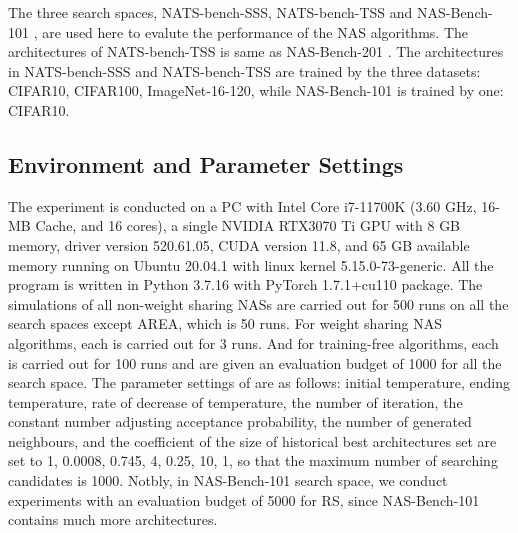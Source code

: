 \documentclass[sigconf]{acmart}
\begin{document}
    The three search spaces, NATS-bench-SSS, NATS-bench-TSS 
    \cite{Dong_2021} and NAS-Bench-101 \cite{ying2019nasbench101}, are used 
    here to evalute the performance of the NAS algorithms. The architectures 
    of NATS-bench-TSS is same as NAS-Bench-201 \cite{dong2020nasbench201}. 
    The architectures in NATS-bench-SSS and NATS-bench-TSS are trained by the three datasets: 
    CIFAR10, CIFAR100, ImageNet-16-120, while NAS-Bench-101 is trained by one: 
    CIFAR10. 

    \subsection{Environment and Parameter Settings}
    The experiment is conducted on a PC with Intel Core i7-11700K (3.60 GHz, 16-MB Cache, and 16 cores), 
    a single NVIDIA RTX3070 Ti GPU with 8 GB memory, driver version 520.61.05, CUDA version 11.8, and 
    65 GB available memory running on Ubuntu 20.04.1 with linux kernel 5.15.0-73-generic. All the program 
    is written in Python 3.7.16 with PyTorch 1.7.1+cu110 package. The simulations of all 
    non-weight sharing NASs are carried out for 500 runs on all the search spaces except AREA, which is 50 runs. 
    For weight sharing NAS algorithms, each is carried out for 3 runs. And for training-free 
    algorithms, each is carried out for 100 runs and are given an evaluation 
    budget of 1000 for all the search space. The parameter settings of \palg{} are as follows: 
    initial temperature, ending temperature, rate of decrease of temperature, the number of iteration, 
    the constant number adjusting acceptance probability, the number of generated neighbours, and 
    the coefficient of the size of historical best architectures set are set 
    to 1, 0.0008, 0.745, 4, 0.25, 10, 1, so that the maximum number of searching candidates is 1000. 
    Notbly, in NAS-Bench-101 search space, we conduct experiments with an evaluation budget of 5000 for RS, 
    since NAS-Bench-101 contains much more architectures.
\end{document}
